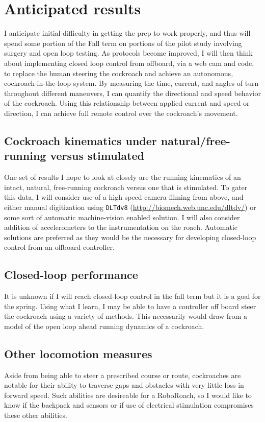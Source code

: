 \section{Anticipated results}
\label{sec:results}

I anticipate initial difficulty in getting the prep to work properly, and thus will spend some portion of the Fall term on portions of the pilot study involving surgery and open loop testing. As protocols become improved, I will then think about implementing closed loop control from offboard, via a web cam and code, to replace the human steering the cockroach and achieve an autonomous, cockroach-in-the-loop system.  By measuring the time, current, and angles of turn throughout different maneuvers, I can quantify the directional and speed behavior of the cockroach. Using this relationship between applied current and speed or direction, I can achieve full remote control over the cockroach's movement. 

\subsection{Cockroach kinematics under natural/free-running versus stimulated}
One set of results I hope to look at closely are the running kinematics of an intact, natural, free-running cockroach versus one that is stimulated. To gater this data, I will consider use of a high speed camera filming from above, and either manual digitization using \lstinline{DLTdv8} (\url{http://biomech.web.unc.edu/dltdv/}) or some sort of automatic machine-vision enabled solution. I will also consider addition of accelerometers to the instrumentation on the roach. Automatic solutions are preferred as they would be the necessary for developing closed-loop control from an offboard controller. 

\subsection{Closed-loop performance}
It is unknown if I will reach closed-loop control in the fall term but it is a goal for the spring. Using what I learn, I may be able to have a controller off board steer the cockroach using a variety of methods. This necessarily would draw from a model of the open loop ahead running dynamics of a cockroach. 

\subsection{Other locomotion measures}
Aside from being able to steer a prescribed course or route, cockroaches are notable for their ability to traverse gaps and obstacles with very little loss in forward speed. Such abilities are desireable for a RoboRoach, so I would like to know if the backpack and sensors or if use of electrical stimulation compromises these other abilities. 


 